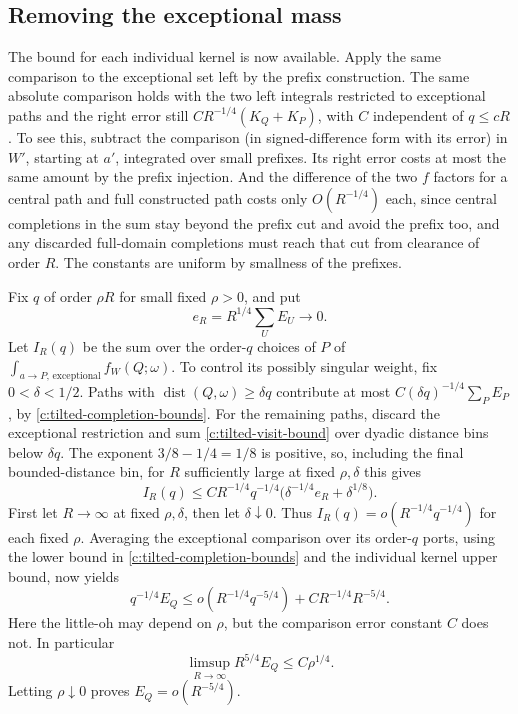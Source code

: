 \documentclass[11pt]{article}
\numberwithin{equation}{section}
\theoremstyle{definition}\newtheorem{definition}[theorem]{Definition}
\theoremstyle{remark}\newtheorem{remark}[theorem]{Remark}
\begin{document}
\subsection{Removing the exceptional mass}\label{c:tilted-exceptional}
The bound for each individual kernel is now available. Apply the same
comparison to the exceptional set left by the prefix construction.
The same absolute comparison holds with the two left integrals restricted to exceptional paths and the right error still \(C R^{-1/4}(K_Q+K_P)\), with \(C\) independent of \(q\le cR\). To see this, subtract the comparison (in signed-difference form with its error) in \(W'\), starting at \(a'\), integrated over small prefixes. Its right error costs at most the same amount by the prefix injection. And the difference of the two \(f\) factors for a central path and full constructed path costs only \(O(R^{-1/4})\) each, since central completions in the sum stay beyond the prefix cut and avoid the prefix too, and any discarded full-domain completions must reach that cut from clearance of order \(R\). The constants are uniform by smallness of the prefixes.



Fix \(q\) of order \(\rho R\) for small fixed \(\rho>0\), and put
\[
 e_R=R^{1/4}\sum_U E_U\longrightarrow0.
\]
Let \(I_R(q)\) be the sum over the order-\(q\) choices of \(P\) of
\(\int_{a\to P,\,\mathrm{exceptional}}f_W(Q;\omega)\).
To control its possibly singular weight, fix \(0<\delta<1/2\).
Paths with \(\operatorname{dist}(Q,\omega)\ge\delta q\) contribute at
most \(C(\delta q)^{-1/4}\sum_P E_P\), by
\eqref{c:tilted-completion-bounds}. For the remaining paths, discard
the exceptional restriction and sum
\eqref{c:tilted-visit-bound} over dyadic distance bins below \(\delta q\).
The exponent \(3/8-1/4=1/8\) is positive, so, including the final
bounded-distance bin, for \(R\) sufficiently large at fixed
\(\rho,\delta\) this gives
\[
 I_R(q)\le C R^{-1/4}q^{-1/4}
       \bigl(\delta^{-1/4}e_R+\delta^{1/8}\bigr).
\]
First let \(R\to\infty\) at fixed \(\rho,\delta\), then let
\(\delta\downarrow0\). Thus \(I_R(q)=o(R^{-1/4}q^{-1/4})\) for
each fixed \(\rho\). Averaging the exceptional comparison over its
order-\(q\) ports, using the lower bound in
\eqref{c:tilted-completion-bounds} and the individual kernel upper
bound, now yields
\[
 q^{-1/4} E_Q \le o(R^{-1/4}q^{-5/4})+C R^{-1/4} R^{-5/4}.
\]
Here the little-oh may depend on \(\rho\), but the comparison error
constant \(C\) does not. In particular
\[
 \limsup_{R\to\infty}R^{5/4}E_Q\le C\rho^{1/4}.
\]
Letting \(\rho\downarrow0\) proves \(E_Q=o(R^{-5/4})\).
\end{document}
